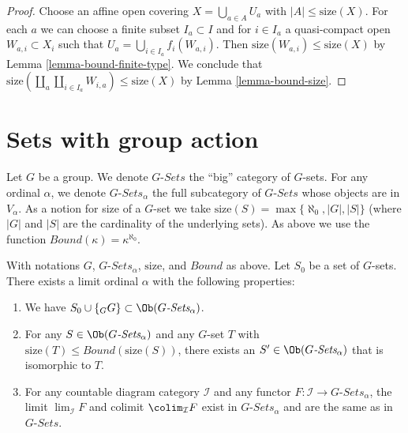 \begin{proof}
Choose an affine open covering $X = \bigcup_{a \in A} U_a$ with
$|A| \leq \text{size}(X)$. For each $a$ we can choose
a finite subset $I_a \subset I$ and for $i \in I_a$ a quasi-compact open
$W_{a, i} \subset X_i$ such that $U_a = \bigcup_{i \in I_a} f_i(W_{a, i})$.
Then $\text{size}(W_{a, i}) \leq \text{size}(X)$ by
Lemma \ref{lemma-bound-finite-type}.
We conclude that
$\text{size}(\coprod_a \coprod_{i \in I_a} W_{i, a}) \leq \text{size}(X)$
by Lemma \ref{lemma-bound-size}.
\end{proof}





\section{Sets with group action}
\label{section-sets-with-group-action}

\noindent
Let $G$ be a group. We denote $G\textit{-Sets}$ the ``big'' category
of $G$-sets. For any ordinal $\alpha$, we denote
$G\textit{-Sets}_\alpha$ the full subcategory of $G\textit{-Sets}$
whose objects are in $V_\alpha$. As a notion for size of a $G$-set
we take $\text{size}(S) = \max\{\aleph_0, |G|, |S|\}$ (where $|G|$ and
$|S|$ are the cardinality of the underlying sets). As above we use the function
$Bound(\kappa) = \kappa^{\aleph_0}$.

\begin{lemma}
\label{lemma-sets-with-group-action}
With notations $G$, $G\textit{-Sets}_\alpha$, $\text{size}$,
and $Bound$ as above. Let $S_0$ be a set of $G$-sets.
There exists a limit ordinal $\alpha$ with the following properties:
\begin{enumerate}
\item We have $S_0 \cup \{{}_GG\} \subset \Ob(G\textit{-Sets}_\alpha)$.
\item For any $S \in \Ob(G\textit{-Sets}_\alpha)$ and any
$G$-set $T$ with $\text{size}(T) \leq Bound(\text{size}(S))$,
there exists an $S' \in \Ob(G\textit{-Sets}_\alpha)$
that is isomorphic to $T$.
\item For any countable diagram category $\mathcal{I}$ and
any functor $F : \mathcal{I} \to G\textit{-Sets}_\alpha$, the
limit $\lim_\mathcal{I} F$ and colimit
$\colim_\mathcal{I} F$ exist in $G\textit{-Sets}_\alpha$
and are the same as in $G\textit{-Sets}$.
\end{enumerate}
\end{lemma}

